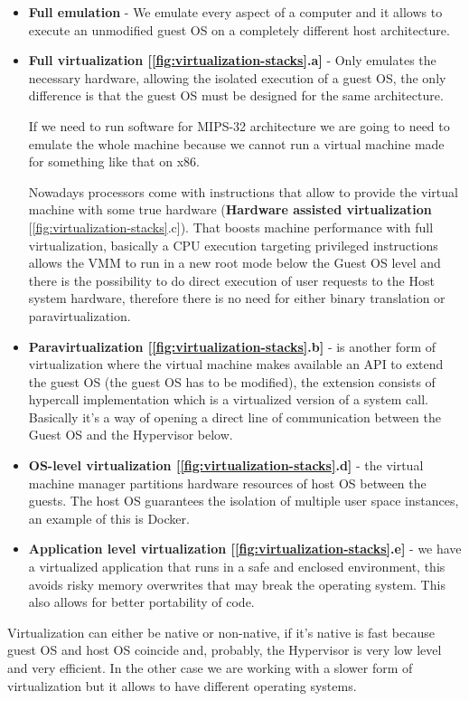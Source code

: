 \begin{itemize}
    \item \textbf{Full emulation} - We emulate every aspect of a computer and it allows to execute an unmodified guest OS on a completely different host architecture.
    \item \textbf{Full virtualization [\ref{fig:virtualization-stacks}.a]} - Only emulates the necessary hardware, allowing the isolated execution of a guest OS, the only difference is that the guest OS must be designed for the same architecture.

    If we need to run software for MIPS-32 architecture we are going to need to emulate the whole machine because we cannot run a virtual machine made for something like that on x86.

    Nowadays processors come with instructions that allow to provide the virtual machine with some true hardware (\textbf{Hardware assisted virtualization} [\ref{fig:virtualization-stacks}.c]). That boosts machine performance with full virtualization, basically a CPU execution targeting privileged instructions allows the VMM to run in a new root mode below the Guest OS level and there is the possibility to do direct execution of user requests to the Host system hardware, therefore there is no need for either binary translation or paravirtualization.
    \item \textbf{Paravirtualization [\ref{fig:virtualization-stacks}.b]} - is another form of virtualization where the virtual machine makes available an API to extend the guest OS (the guest OS has to be modified), the extension consists of hypercall implementation which is a virtualized version of a system call. Basically it's a way of opening a direct line of communication between the Guest OS and the Hypervisor below.
    \item \textbf{OS-level virtualization [\ref{fig:virtualization-stacks}.d]} - the virtual machine manager partitions hardware resources of host OS between the guests. The host OS guarantees the isolation of multiple user space instances, an example of this is Docker.
    \item \textbf{Application level virtualization [\ref{fig:virtualization-stacks}.e]} - we have a virtualized application that runs in a safe and enclosed environment, this avoids risky memory overwrites that may break the operating system. This also allows for better portability of code.
\end{itemize}
Virtualization can either be native or non-native, if it's native is fast because guest OS and host OS coincide and, probably, the Hypervisor is very low level and very efficient. In the other case we are working with a slower form of virtualization but it allows to have different operating systems.

